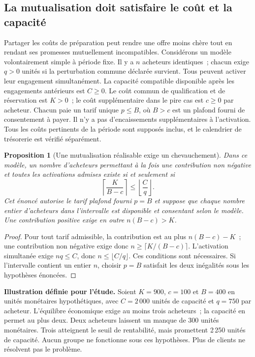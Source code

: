 \documentclass[11pt,a4paper]{article}
\newtheorem{proposition}{Proposition}
\begin{document}
\subsection{La mutualisation doit satisfaire le coût et la capacité}
Partager les coûts de préparation peut rendre une offre moins chère tout en rendant ses promesses mutuellement incompatibles. Considérons un modèle volontairement simple à période fixe. Il y a $n$ acheteurs identiques~; chacun exige $q>0$ unités si la perturbation commune déclarée survient. Tous peuvent activer leur engagement simultanément. La capacité compatible disponible après les engagements antérieurs est $C\geq0$. Le coût commun de qualification et de réservation est $K>0$~; le coût supplémentaire dans le pire cas est $c\geq0$ par acheteur. Chacun paie un tarif unique $p\leq B$, où $B>c$ est un plafond fourni de consentement à payer. Il n’y a pas d’encaissements supplémentaires à l’activation. Tous les coûts pertinents de la période sont supposés inclus, et le calendrier de trésorerie est vérifié séparément.

\begin{proposition}[Une mutualisation réalisable exige un chevauchement]
Dans ce modèle, un nombre d’acheteurs permettant à la fois une contribution non négative et toutes les activations admises existe si et seulement si
\begin{equation}
\left\lceil\frac{K}{B-c}\right\rceil
\leq
\left\lfloor\frac{C}{q}\right\rfloor.
\label{eq:pool}
\end{equation}
Cet énoncé autorise le tarif plafond fourni $p=B$ et suppose que chaque nombre entier d’acheteurs dans l’intervalle est disponible et consentant selon le modèle. Une contribution positive exige en outre $n(B-c)>K$.
\end{proposition}
\begin{proof}
Pour tout tarif admissible, la contribution est au plus $n(B-c)-K$~; une contribution non négative exige donc $n\geq\lceil K/(B-c)\rceil$. L’activation simultanée exige $nq\leq C$, donc $n\leq\lfloor C/q\rfloor$. Ces conditions sont nécessaires. Si l’intervalle contient un entier $n$, choisir $p=B$ satisfait les deux inégalités sous les hypothèses énoncées.\end{proof}

\textbf{Illustration définie pour l’étude.} Soient $K=900$, $c=100$ et $B=400$ en unités monétaires hypothétiques, avec $C=2\,000$ unités de capacité et $q=750$ par acheteur. L’équilibre économique exige au moins trois acheteurs~; la capacité en permet au plus deux. Deux acheteurs laissent un manque de 300 unités monétaires. Trois atteignent le seuil de rentabilité, mais promettent 2\,250 unités de capacité. Aucun groupe ne fonctionne sous ces hypothèses. Plus de clients ne résolvent pas le problème.
\end{document}
